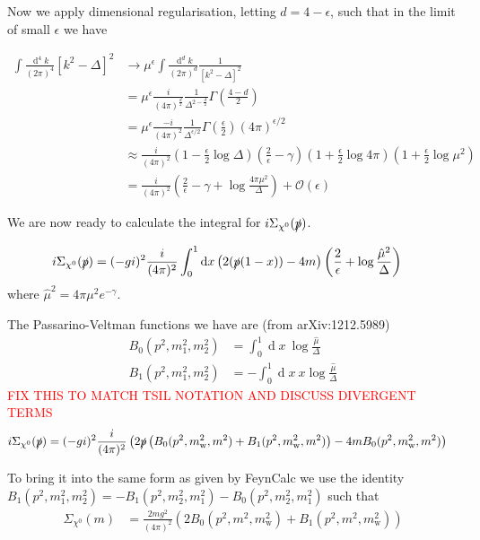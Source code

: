 \documentclass[11pt]{article}
\def\sp{\slashed{p}}
\def\cn{\chi^0}
\renewcommand{\d}{\ensuremath{\operatorname{d}\!}}
\def\he{\frac{\epsilon}{2}}
\begin{document}
Now we apply dimensional regularisation, letting $d=4-\epsilon$, such that in the limit of small $\epsilon$ we have


\begin{align*}
\int \frac{\d^4k}{(2\pi)^4}{[ k^2-\Delta]^2} &\rightarrow  \mu^{\epsilon}\int \frac{\d^dk}{(2\pi)^d}  \frac{1}{[ k^2-\Delta]^2}\\
&= \mu^{\epsilon}\frac{i}{(4\pi)^{\frac{d}{2}}} \frac{1}{\Delta^{2-\frac{d}{2}}} \Gamma\left(\frac{4-d}{2}\right) \\
&= \mu^{\epsilon}\frac{-i}{(4\pi)^2}\frac{1}{\Delta^{\epsilon/2}}\Gamma\left(\frac{\epsilon}{2}\right) (4\pi)^{\epsilon/2}\\
&\approx \frac{i}{(4\pi)^2} \left( 1-\he\log\Delta\right)\left(\frac{2}{\epsilon}-\gamma\right)\left(1+\he\log 4\pi\right)\left(1+\he\log\mu^2\right)\\
&=\frac{i}{(4\pi)^2} \left(\frac{2}{\epsilon}-\gamma+\log\frac{4\pi\mu^2}{\Delta}\right)+\mathcal{O}(\epsilon)
\end{align*}

We are now ready to calculate the integral for $i\Sigma_{\cn}(\slashed{p})$.

\begin{align}
i\Sigma_{\cn}(\slashed{p})&= (-gi)^2 \frac{i}{(4\pi)^2}  \int_0^1 \d x \left(2(\sp(1-x))-4m\right) \left(\frac{2}{\epsilon}+\log\frac{\hat{\mu}^2}{\Delta}\right)
\end{align}
where $\hat{\mu}^2=4\pi\mu^2e^{-\gamma}$.

The Passarino-Veltman functions we have are (from arXiv:1212.5989)
\begin{align}
B_0(p^2,m_1^2,m_2^2)&=\int_0^1\!\d x \ \log\frac{\hat{\mu}}{\Delta}\\
B_1(p^2,m_1^2,m_2^2)&=-\int_0^1\!\d x \ x\log\frac{\hat{\mu}}{\Delta}
\end{align}
\textcolor{red}{FIX THIS TO MATCH TSIL NOTATION AND DISCUSS DIVERGENT TERMS}
\begin{align}
i\Sigma_{\cn}(\slashed{p})&= (-gi)^2 \frac{i}{(4\pi)^2}  \left(2\sp\left( B_0(p^2,m_{\text{w}}^2,m^2)+B_1(p^2,m_{\text{w}}^2,m^2)\right)-4mB_0(p^2,m_{\text{w}}^2,m^2)\right)
\end{align}

To bring it into the same form as given by FeynCalc we use the identity $B_1(p^2,m_1^2,m_2^2)=-B_1(p^2,m_2^2,m_1^2)-B_0(p^2,m_2^2,m_1^2)$ such that
\begin{align}
\Sigma_{\cn}(m)&= \frac{2mg^2}{(4\pi)^2}   \left( 2B_0(p^2,m^2,m_{\text{w}}^2)+B_1(p^2,m^2,m_{\text{w}}^2)\right)
\end{align}
\end{document}
